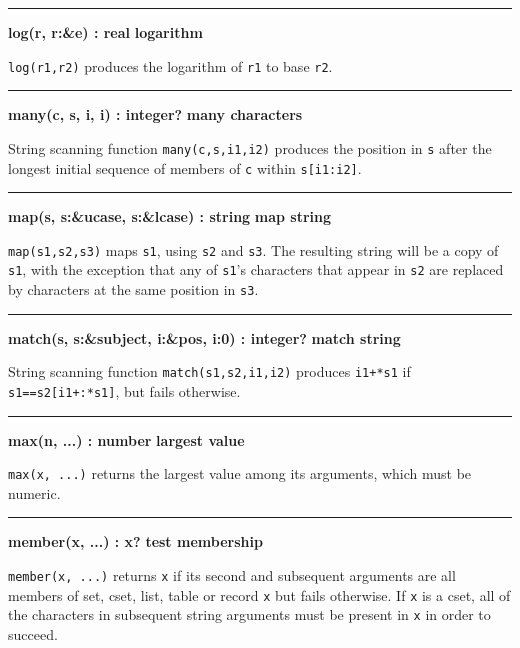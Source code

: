 \bigskip\hrule\vspace{0.1cm}
\noindent
{\bf log(r, r:\&e) : real } \hfill {\bf logarithm}

\noindent
{}\texttt{log(r1,r2)} produces the logarithm of
\texttt{r1} to base \texttt{r2}.

\bigskip\hrule\vspace{0.1cm}
\noindent
{\bf many(c, s, i, i) : integer? } \hfill {\bf many characters}

\noindent
{}String scanning function \texttt{many(c,s,i1,i2)} produces
the position in \texttt{s} after the longest initial sequence of
members of \texttt{c} within \texttt{s[i1:i2]}.

\bigskip\hrule\vspace{0.1cm}
\noindent
{\bf map(s, s:\&ucase, s:\&lcase) : string } \hfill {\bf map string}

\noindent
{}\texttt{map(s1,s2,s3)} maps \texttt{s1}, using
\texttt{s2} and \texttt{s3}. The resulting string will be a copy of
\texttt{s1}, with the exception that any of
\texttt{s1}'s characters that appear in \texttt{s2}
are replaced by characters at the same position in \texttt{s3}.

\bigskip\hrule\vspace{0.1cm}
\noindent
{\bf match(s, s:\&subject, i:\&pos, i:0) : integer? } \hfill {\bf match string}

\noindent
{}String scanning function \texttt{match(s1,s2,i1,i2)}
produces \texttt{i1+*s1} if \texttt{s1==s2[i1+:*s1]}, but fails
otherwise.

\bigskip\hrule\vspace{0.1cm}
\noindent
{\bf max(n, ...) : number } \hfill {\bf largest value}

\noindent
{}\texttt{max(x, ...)} returns the largest value among its
arguments, which must be numeric.

\bigskip\hrule\vspace{0.1cm}
\noindent
{\bf member(x, ...) : x? } \hfill {\bf test membership}

\noindent
{}\texttt{member(x, ...)} returns \texttt{x} if its second
and subsequent arguments are all members of set, cset, list, table or record
\texttt{x} but fails otherwise. If \texttt{x} is a cset, all of the
characters in subsequent string arguments must be present in \texttt{x}
in order to succeed.

